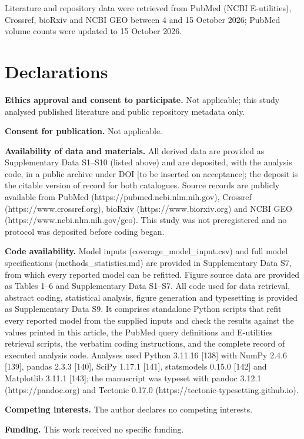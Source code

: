 \documentclass[11pt]{article}
\begin{document}
Literature and repository data were retrieved from PubMed (NCBI
E-utilities), Crossref, bioRxiv and NCBI GEO between 4 and 15 October
2026; PubMed volume counts were updated to 15 October 2026.

\section{Declarations}\label{declarations}

\textbf{Ethics approval and consent to participate.} Not applicable;
this study analysed published literature and public repository metadata
only.

\textbf{Consent for publication.} Not applicable.

\textbf{Availability of data and materials.} All derived data are
provided as Supplementary Data S1--S10 (listed above) and are deposited,
with the analysis code, in a public archive under DOI {[}to be inserted
on acceptance{]}; the deposit is the citable version of record for both
catalogues. Source records are publicly available from PubMed
(https://pubmed.ncbi.nlm.nih.gov), Crossref (https://www.crossref.org),
bioRxiv (https://www.biorxiv.org) and NCBI GEO
(https://www.ncbi.nlm.nih.gov/geo). This study was not preregistered and
no protocol was deposited before coding began.

\textbf{Code availability.} Model inputs (coverage\_model\_input.csv)
and full model specifications (methods\_statistics.md) are provided in
Supplementary Data S7, from which every reported model can be refitted.
Figure source data are provided as Tables 1--6 and Supplementary Data
S1--S7. All code used for data retrieval, abstract coding, statistical
analysis, figure generation and typesetting is provided as Supplementary
Data S9. It comprises standalone Python scripts that refit every
reported model from the supplied inputs and check the results against
the values printed in this article, the PubMed query definitions and
E-utilities retrieval scripts, the verbatim coding instructions, and the
complete record of executed analysis code. Analyses used Python 3.11.16
{[}138{]} with NumPy 2.4.6 {[}139{]}, pandas 2.3.3 {[}140{]}, SciPy
1.17.1 {[}141{]}, statsmodels 0.15.0 {[}142{]} and Matplotlib 3.11.1
{[}143{]}; the manuscript was typeset with pandoc 3.12.1
(https://pandoc.org) and Tectonic 0.17.0
(https://tectonic-typesetting.github.io).

\textbf{Competing interests.} The author declares no competing
interests.

\textbf{Funding.} This work received no specific funding.
\end{document}
